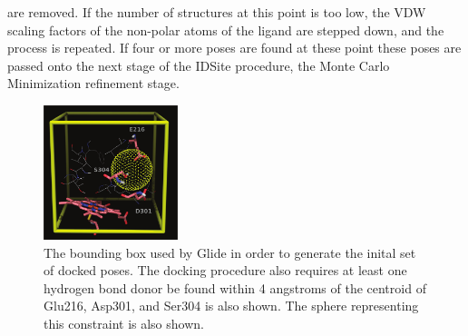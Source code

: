 are removed.
If the number of structures at this point is too low, the VDW scaling factors of the non-polar atoms of the ligand are stepped down, and the process is repeated.
If four or more poses are found at these point these poses are passed onto the next stage of the IDSite procedure, the Monte Carlo Minimization refinement stage.

\begin{figure}[h]
\centering
\includegraphics[width=0.35\textwidth]{figures/idsite/glide.png}
\caption{The bounding box used by Glide in order to generate the inital set of docked poses.
The docking procedure also requires at least one hydrogen bond donor be found within 4 angstroms of the centroid of Glu216, Asp301, and Ser304 is also shown.
The sphere representing this constraint is also shown.}
\label{fig:idsite_glide}
\end{figure}


